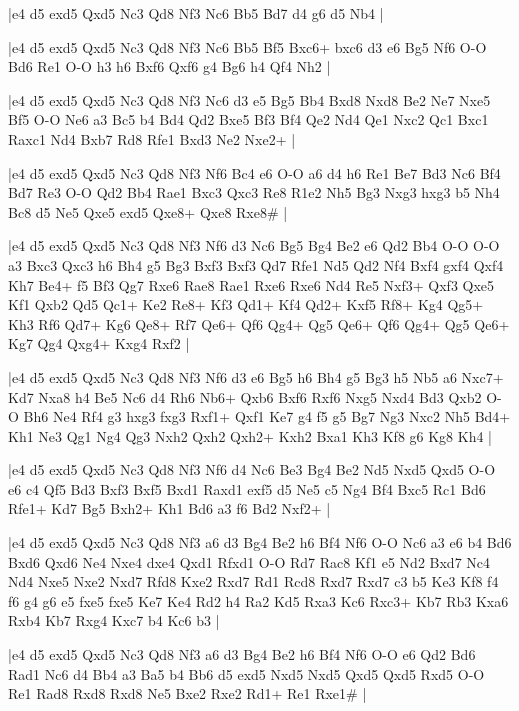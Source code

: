 \whitename{}
\blackname{}
\makegametitle
|e4 d5 exd5 Qxd5 Nc3 Qd8 Nf3 Nc6 Bb5 Bd7 d4 g6 d5 Nb4  |

\whitename{}
\blackname{}
\makegametitle
|e4 d5 exd5 Qxd5 Nc3 Qd8 Nf3 Nc6 Bb5 Bf5 Bxc6+ bxc6 d3 e6 Bg5 Nf6 O-O Bd6 Re1 O-O h3 h6 Bxf6 Qxf6 g4 Bg6 h4 Qf4 Nh2  |

\whitename{}
\blackname{}
\makegametitle
|e4 d5 exd5 Qxd5 Nc3 Qd8 Nf3 Nc6 d3 e5 Bg5 Bb4 Bxd8 Nxd8 Be2 Ne7 Nxe5 Bf5 O-O Ne6 a3 Bc5 b4 Bd4 Qd2 Bxe5 Bf3 Bf4 Qe2 Nd4 Qe1 Nxc2 Qc1 Bxc1 Raxc1 Nd4 Bxb7 Rd8 Rfe1 Bxd3 Ne2 Nxe2+  |

\whitename{}
\blackname{}
\makegametitle
|e4 d5 exd5 Qxd5 Nc3 Qd8 Nf3 Nf6 Bc4 e6 O-O a6 d4 h6 Re1 Be7 Bd3 Nc6 Bf4 Bd7 Re3 O-O Qd2 Bb4 Rae1 Bxc3 Qxc3 Re8 R1e2 Nh5 Bg3 Nxg3 hxg3 b5 Nh4 Bc8 d5 Ne5 Qxe5 exd5 Qxe8+ Qxe8 Rxe8\#  |

\whitename{}
\blackname{}
\makegametitle
|e4 d5 exd5 Qxd5 Nc3 Qd8 Nf3 Nf6 d3 Nc6 Bg5 Bg4 Be2 e6 Qd2 Bb4 O-O O-O a3 Bxc3 Qxc3 h6 Bh4 g5 Bg3 Bxf3 Bxf3 Qd7 Rfe1 Nd5 Qd2 Nf4 Bxf4 gxf4 Qxf4 Kh7 Be4+ f5 Bf3 Qg7 Rxe6 Rae8 Rae1 Rxe6 Rxe6 Nd4 Re5 Nxf3+ Qxf3 Qxe5 Kf1 Qxb2 Qd5 Qc1+ Ke2 Re8+ Kf3 Qd1+ Kf4 Qd2+ Kxf5 Rf8+ Kg4 Qg5+ Kh3 Rf6 Qd7+ Kg6 Qe8+ Rf7 Qe6+ Qf6 Qg4+ Qg5 Qe6+ Qf6 Qg4+ Qg5 Qe6+ Kg7 Qg4 Qxg4+ Kxg4 Rxf2  |

\whitename{}
\blackname{}
\makegametitle
|e4 d5 exd5 Qxd5 Nc3 Qd8 Nf3 Nf6 d3 e6 Bg5 h6 Bh4 g5 Bg3 h5 Nb5 a6 Nxc7+ Kd7 Nxa8 h4 Be5 Nc6 d4 Rh6 Nb6+ Qxb6 Bxf6 Rxf6 Nxg5 Nxd4 Bd3 Qxb2 O-O Bh6 Ne4 Rf4 g3 hxg3 fxg3 Rxf1+ Qxf1 Ke7 g4 f5 g5 Bg7 Ng3 Nxc2 Nh5 Bd4+ Kh1 Ne3 Qg1 Ng4 Qg3 Nxh2 Qxh2 Qxh2+ Kxh2 Bxa1 Kh3 Kf8 g6 Kg8 Kh4  |

\whitename{}
\blackname{}
\makegametitle
|e4 d5 exd5 Qxd5 Nc3 Qd8 Nf3 Nf6 d4 Nc6 Be3 Bg4 Be2 Nd5 Nxd5 Qxd5 O-O e6 c4 Qf5 Bd3 Bxf3 Bxf5 Bxd1 Raxd1 exf5 d5 Ne5 c5 Ng4 Bf4 Bxc5 Rc1 Bd6 Rfe1+ Kd7 Bg5 Bxh2+ Kh1 Bd6 a3 f6 Bd2 Nxf2+  |

\whitename{}
\blackname{}
\makegametitle
|e4 d5 exd5 Qxd5 Nc3 Qd8 Nf3 a6 d3 Bg4 Be2 h6 Bf4 Nf6 O-O Nc6 a3 e6 b4 Bd6 Bxd6 Qxd6 Ne4 Nxe4 dxe4 Qxd1 Rfxd1 O-O Rd7 Rac8 Kf1 e5 Nd2 Bxd7 Nc4 Nd4 Nxe5 Nxe2 Nxd7 Rfd8 Kxe2 Rxd7 Rd1 Rcd8 Rxd7 Rxd7 c3 b5 Ke3 Kf8 f4 f6 g4 g6 e5 fxe5 fxe5 Ke7 Ke4 Rd2 h4 Ra2 Kd5 Rxa3 Kc6 Rxc3+ Kb7 Rb3 Kxa6 Rxb4 Kb7 Rxg4 Kxc7 b4 Kc6 b3  |

\whitename{}
\blackname{}
\makegametitle
|e4 d5 exd5 Qxd5 Nc3 Qd8 Nf3 a6 d3 Bg4 Be2 h6 Bf4 Nf6 O-O e6 Qd2 Bd6 Rad1 Nc6 d4 Bb4 a3 Ba5 b4 Bb6 d5 exd5 Nxd5 Nxd5 Qxd5 Qxd5 Rxd5 O-O Re1 Rad8 Rxd8 Rxd8 Ne5 Bxe2 Rxe2 Rd1+ Re1 Rxe1\#  |

